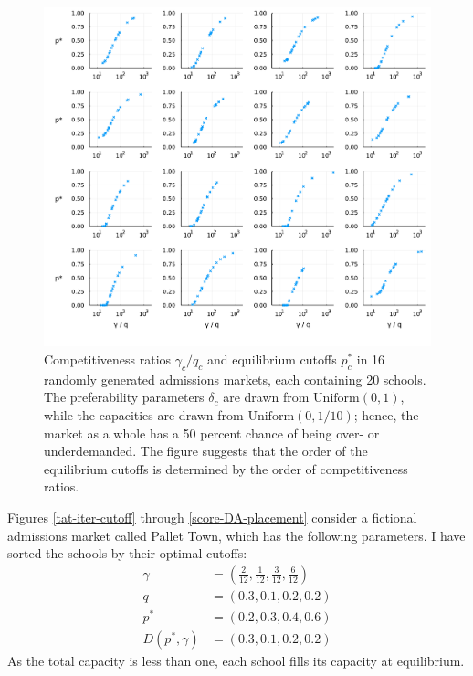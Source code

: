\documentclass[12pt]{article}
\theoremstyle{definition}
\begin{document}
\begin{figure}
\begin{center}\includegraphics[width=\linewidth, ]{plots/gammaq-pstar.pdf}\end{center}
\captionsetup{singlelinecheck=off}
    \caption[.]{Competitiveness ratios $\gamma_c / q_c$ and equilibrium cutoffs $p_c^*$ in 16 randomly generated admissions markets, each containing 20 schools. The preferability parameters $\delta_c$ are drawn from $\operatorname{Uniform(0, 1)}$, while the capacities are drawn from $\operatorname{Uniform(0, 1/10)}$; hence, the market as a whole has a 50 percent chance of being over- or underdemanded. The figure suggests that the order of the equilibrium cutoffs is determined by the order of competitiveness ratios.}
\label{gammaq-pstar}
\end{figure}

Figures \ref{tat-iter-cutoff} through \ref{score-DA-placement} consider a fictional admissions market called Pallet Town, which has the following parameters. I have sorted the schools by their optimal cutoffs:
\begin{align*}
\gamma &=  \textstyle{\left(\frac{2}{12}, \frac{1}{12}, \frac{3}{12}, \frac{6}{12}\right)}\\
q &= (0.3, 0.1, 0.2, 0.2) \\
p^* &= (0.2, 0.3, 0.4, 0.6)\\
D(p^*, \gamma) &=  (0.3, 0.1, 0.2, 0.2)
\end{align*}
As the total capacity is less than one, each school fills its capacity at equilibrium.
\end{document}

